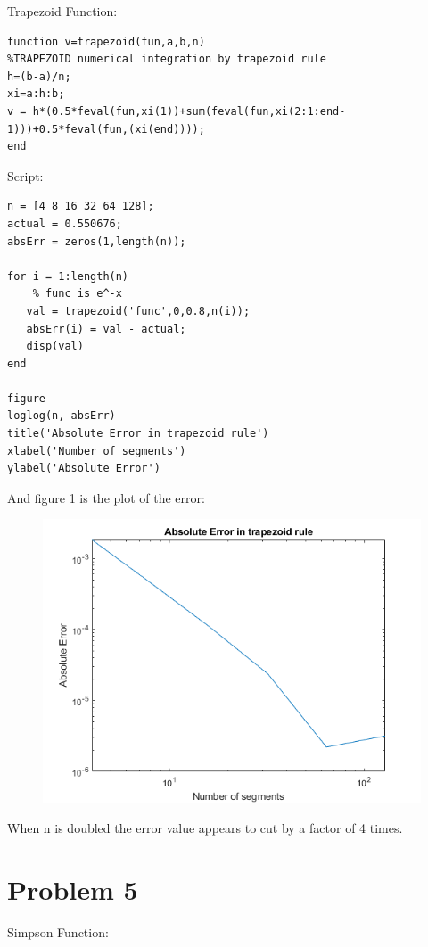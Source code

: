 \documentclass[]{article}
\begin{document}
Trapezoid Function:

\begin{verbatim}
function v=trapezoid(fun,a,b,n)
%TRAPEZOID numerical integration by trapezoid rule
h=(b-a)/n;
xi=a:h:b;
v = h*(0.5*feval(fun,xi(1))+sum(feval(fun,xi(2:1:end-1)))+0.5*feval(fun,(xi(end))));
end
\end{verbatim}

Script:

\begin{verbatim}
n = [4 8 16 32 64 128];
actual = 0.550676;
absErr = zeros(1,length(n));

for i = 1:length(n)
    % func is e^-x
   val = trapezoid('func',0,0.8,n(i));
   absErr(i) = val - actual;
   disp(val)
end

figure
loglog(n, absErr)
title('Absolute Error in trapezoid rule')
xlabel('Number of segments')
ylabel('Absolute Error')
\end{verbatim}

And figure 1 is the plot of the error:

\begin{figure}
\centering
\includegraphics{./ch4prob4.png}
\caption{}
\end{figure}

When n is doubled the error value appears to cut by a factor of 4 times.

\section{Problem 5}\label{problem-5}

Simpson Function:
\end{document}
